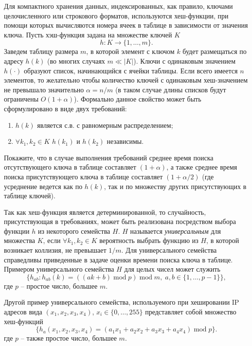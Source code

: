 \begin{problem}
\label{hesh_func}
Для компактного хранения данных, индексированных, как правило, ключами целочисленного или строкового форматов, используются хеш-функции, при помощи которых вычисляются  номера ячеек в таблице в зависимости от значения ключа. Пусть хэш-функция задана на множестве ключей $K$ 
\[
h: K \to \{1,\ldots,m\}.
\]  
Заведем таблицу размера $m$, в которой элемент с ключом $k$ будет размещаться по адресу $h(k)$ (во многих случаях $m \ll |K|$). Ключи с одинаковым значением $h(\cdot)$ образуют список, начинающийся с ячейки таблицы. Если всего имеется $n$ элементов, то желательно чтобы количество ключей с одинаковым хеш-значением не  превышало значительно $\alpha = n/m$ (в таком случае длины списков будут ограничены $O(1+\alpha)$). Формально данное свойство может быть сформулировано в виде двух требований:
\begin{enumerate}
\item $h(k)$ является с.в. с равномерным распределением;
\item $\forall k_1, k_2 \in K$ $h(k_1)$ и  $h(k_2)$ независимы.  
\end{enumerate}    
Покажите, что в случае выполнения требований среднее время поиска отсутствующего ключа в таблице составляет $(1+ \alpha)$, а также среднее время поиска присутствующего ключа в таблице составляет $(1+ \alpha/2)$ (где усреднение ведется как по $h(k)$, так и по множеству других присутствующих в таблице ключей). 
\end{problem}

\begin{remark}
Так как хеш-функция является детерминированной, то случайность, присутствующая в требованиях, может быть реализована посредством выбора функции $h$ из некоторого семейства $H$. $H$ называется \textit{универсальным} для множества $K$, если $\forall k_1, k_2 \in K$ вероятность выбрать функцию из $H$, в которой возникает коллизия, не превышает $1/m$. Для универсального семейства справедливы приведенные в задаче оценки времени поиска ключа в таблице. 
Примером универсального семейства $H$ для целых чисел может служить
\[
\{h_{ab}: h_{ab}(k) = ((ak +b) \; \text{mod} \; p) \; \text{mod} \;   m, \; a,b \in \{1,\ldots, p-1\}\},
\]    
где $p$ -- простое число, большее $m$.

Другой пример универсального семейства, используемого при хешировании IP адресов вида $(x_1,x_2,x_3,x_4)$, $x_i \in \{0,\ldots,255\}$ представляет собой 
множество хеш-функций
\[
\{
h_a(x_1,x_2,x_3,x_4) = (a_1 x_1 + a_2 x_2 + a_3 x_3 + a_4 x_4) \; \text{mod} \; p
\}.
\]
где $p$ -- также простое число, большее $m$.
\end{remark}

